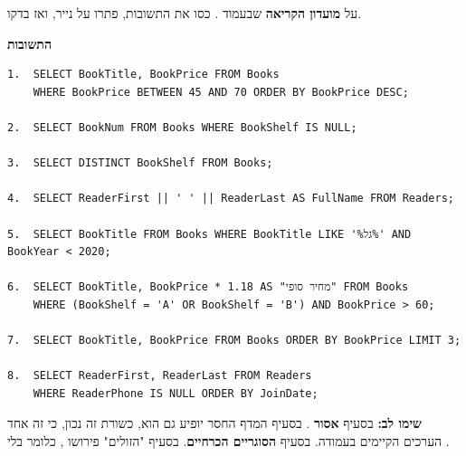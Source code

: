 \documentclass[11pt,a4paper]{article}
\begin{document}
{\small על \textbf{מועדון הקריאה} שבעמוד . כסו את התשובות, פתרו על נייר, ואז בדקו.}

\vspace{3pt}

\vspace{8pt}
\begin{panel}
\textbf{התשובות}

\vspace{2pt}
\begin{otherlanguage}{english}
\begin{Verbatim}[fontsize=\small]
1.  SELECT BookTitle, BookPrice FROM Books
    WHERE BookPrice BETWEEN 45 AND 70 ORDER BY BookPrice DESC;

2.  SELECT BookNum FROM Books WHERE BookShelf IS NULL;

3.  SELECT DISTINCT BookShelf FROM Books;

4.  SELECT ReaderFirst || ' ' || ReaderLast AS FullName FROM Readers;

5.  SELECT BookTitle FROM Books WHERE BookTitle LIKE '%גל%' AND BookYear < 2020;

6.  SELECT BookTitle, BookPrice * 1.18 AS "מחיר סופי" FROM Books
    WHERE (BookShelf = 'A' OR BookShelf = 'B') AND BookPrice > 60;

7.  SELECT BookTitle, BookPrice FROM Books ORDER BY BookPrice LIMIT 3;

8.  SELECT ReaderFirst, ReaderLast FROM Readers
    WHERE ReaderPhone IS NULL ORDER BY JoinDate;
\end{Verbatim}
\end{otherlanguage}

\vspace{2pt}
{\small\textbf{שימו לב:} בסעיף  \textbf{אסור} . בסעיף  המדף החסר יופיע גם הוא, כשורת  \textendash{} זה נכון, כי זה אחד הערכים הקיימים בעמודה. בסעיף  \textbf{הסוגריים הכרחיים}. בסעיף  "הזולים" פירושו , כלומר בלי .}
\end{panel}
\end{document}
